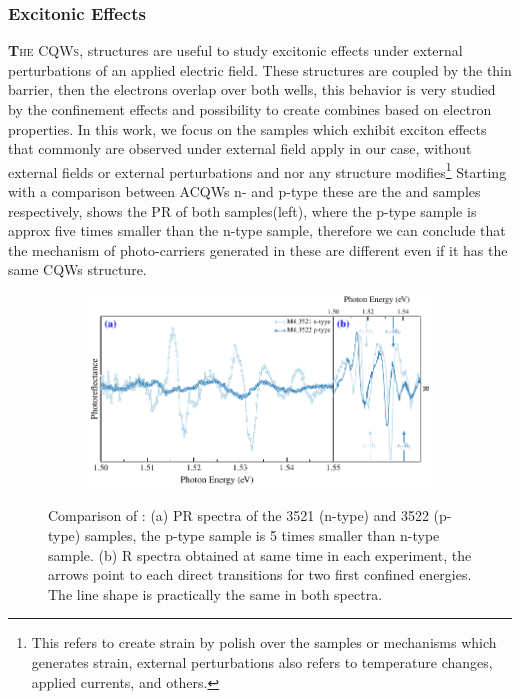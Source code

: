 \subsubsection{Excitonic Effects}
\label{subsubsec:chapter-3-PR-exciton-effects}
\vspace{-10mm} 
\lettrine[lines=3, lraise=.1, nindent=0mm, slope=0mm]{\textbf{T}}{he CQWs}, structures are useful to study excitonic effects under external perturbations of an applied electric field. These structures are coupled by the thin barrier, then the electrons overlap over both wells,  this behavior is very studied by the confinement effects and possibility to create combines based on electron properties.  In this work, we focus on the samples which exhibit exciton effects that commonly are observed under external field apply in our case, without external fields or external perturbations and nor any structure modifies\footnote{This refers to create strain by polish over the samples or mechanisms which generates strain, external perturbations also refers to temperature changes, applied currents, and others.} Starting with a comparison between ACQWs n- and p-type these are the  and  samples respectively,  shows the PR of both samples(left), where the p-type sample is approx five times smaller than the n-type sample, therefore we can conclude that the mechanism of photo-carriers generated in these are different even if it has the same \gls{CQWs} structure.   

\begin{figure}[ht!]
	\centering
\begin{subfigure}{\textwidth}
	\includegraphics[width=\textwidth]{../figures/chapter-3/pr-plots/build-ruco/pr-set3.pdf}
	\label{fig:chapter-3-PR-PLOT-SET3-a)}
	\label{fig:chapter-3-PR-PLOT-SET3-b)}
\end{subfigure}
	\caption{Comparison of : (a) PR spectra of the 3521 (n-type) and 3522 (p-type) samples, the p-type sample is 5 times smaller than n-type sample. (b) R spectra obtained at same time in each experiment, the arrows point to each direct transitions for two first confined energies. The line shape is practically the same in both spectra.} 
	\label{fig:chapter-3-PR-PLOT-SET3}
\end{figure}


